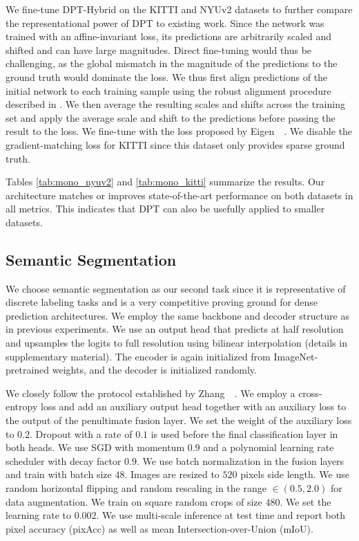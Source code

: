 \documentclass[10pt,twocolumn,letterpaper]{article}
\begin{document}
 We fine-tune DPT-Hybrid on the KITTI
\cite{Geiger2012} and NYUv2 \cite{Silberman2012} datasets to further
compare the representational power of DPT to existing work. Since the network was trained
with an affine-invariant loss, its predictions are arbitrarily scaled and
shifted and can have large magnitudes. Direct fine-tuning would
thus be challenging, as the global mismatch in the magnitude of the predictions to
the ground truth would dominate the loss. We thus first align predictions of the
initial network to each training sample using the robust alignment procedure
described in \cite{Ranftl2020}. We then average the resulting scales and shifts
across the training set and apply the average scale and shift to the predictions
before passing the result to the loss. We fine-tune with the loss
proposed by Eigen~\etal~\cite{Eigen2014}. We disable the gradient-matching loss
for KITTI since this dataset only provides sparse ground truth.


Tables \ref{tab:mono_nyuv2} and \ref{tab:mono_kitti} summarize the results. Our
architecture matches or improves state-of-the-art performance on both
datasets in all metrics. This indicates that DPT can also be usefully applied to smaller datasets.


\subsection{Semantic Segmentation}

We choose semantic segmentation as our second task since it is representative
of discrete labeling tasks and is a very competitive proving ground for dense
prediction architectures. We employ the same backbone and decoder structure as
in previous experiments. We use an output head that predicts at half resolution
and upsamples the logits to full resolution using bilinear interpolation
(details in supplementary material). The encoder is again initialized from
ImageNet-pretrained weights, and the decoder is initialized randomly.


 We closely follow the protocol established by
Zhang~\etal~\cite{Zhang2020}. We employ a cross-entropy loss and add an
auxiliary output head together with an auxiliary loss to the output of the
penultimate fusion layer. We set the weight of the auxiliary loss to $0.2$.
Dropout with a rate of $0.1$ is used before the final classification layer in
both heads. We use SGD with momentum $0.9$ and a polynomial learning rate
scheduler with decay factor $0.9$. We use batch normalization in the fusion
layers and train with batch size $48$. Images are resized to $520$ pixels side
length. We use random horizontal flipping and random rescaling in the range
$\in (0.5, 2.0)$ for data augmentation. We train on square random crops of size
$480$. We set the learning rate to $0.002$. We use multi-scale inference at test
time and report both pixel accuracy (pixAcc) as well as mean
Intersection-over-Union (mIoU).
\end{document}
